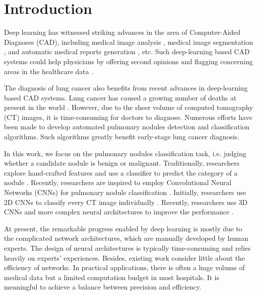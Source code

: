 \documentclass[final,5p,times,twocolumn]{elsarticle}
\begin{document}
\section{Introduction}
\label{sec:intro}

Deep learning \citep{krizhevsky2012imagenet} has witnessed striking advances in the area of Computer-Aided Diagnoses (CAD), including medical image analysis \cite{Taj2016CNN}, medical image segmentation \cite{ada2019MRIseg}, and automatic medical reports generation \cite{Li2018Hybrid}, etc. Such deep-learning based CAD systems could help physicians by offering second opinions and flagging concerning areas in the healthcare data  \citep{DLhealth2019nature}. 



The diagnosis of lung cancer also benefits from recent advances in deep-learning based CAD systems. 
Lung cancer has caused a growing number of deaths at present in the world \citep{Siegel2018cancer}. 
However, due to the sheer volume of computed tomography (CT) images, it is time-consuming for doctors to diagnose. Numerous efforts have been made to develop automated pulmonary nodules detection \citep{xie2019PR} and classification \citep{zhu2018deeplung, JIANG2019AEDPN} algorithms. Such algorithms greatly benefit early-stage lung cancer diagnosis. 

In this work, we focus on the pulmonary nodules classification task, i.e. judging whether a candidate nodule is benign or malignant. Traditionally, researchers explore hand-crafted features and use a classifier to predict the category of a nodule \citep{Fan2014Lung}. Recently, researchers are inspired to employ Convolutional Neural Networks (CNNs) for pulmonary nodule classification \citep{anthimopoulos2016lung}. Initially, researchers use 2D CNNs to classify every CT image individually \citep{shen2017multi}. 
Recently, researchers use 3D CNNs and more complex neural architectures to improve the performance \citep{zhu2018deeplung}.

At present, the remarkable progress enabled by deep learning is mostly due to the complicated network architectures, which are manually developed by human experts. The design of neural architectures is typically time-consuming and relies heavily on experts' experiences. Besides, existing work consider little about the efficiency of networks. In practical applications, there is often a huge volume of medical data but a limited computation budget in most hospitals. It is meaningful to achieve a balance between precision and efficiency. 
\end{document}
